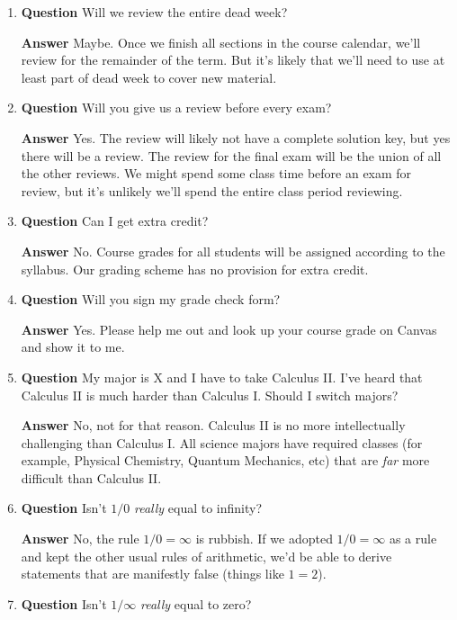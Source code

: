 \documentclass[12pt]{article}
\newcounter{ex}\setcounter{ex}{0}
\begin{document}
\begin{enumerate}
\item  \textbf{Question}  Will  we review the entire dead week?

\textbf{Answer} Maybe.  Once we finish all sections in the course 
calendar, we'll review for the remainder of the term.  But it's 
likely that we'll need to use at least part of dead week to cover
new material. 


\item  \textbf{Question}  Will you give us a review before every exam?

\textbf{Answer} Yes. The review will likely not have a complete solution key, but yes there will be a review. The review for the final exam will be the union of all the other reviews.  We might spend some class time before an exam for review, but it's unlikely we'll spend the entire class period reviewing. 

\item  \textbf{Question}  Can I get extra credit?

\textbf{Answer} No. Course grades for all students will be
assigned according to the syllabus. Our grading scheme has 
no provision for extra credit. 

\item  \textbf{Question}  Will you sign my grade check form?

\textbf{Answer} Yes.  Please help me out and look up your course grade on Canvas and show it to me.

\item  \textbf{Question}  My major is X and I have to take Calculus II.  I've heard that Calculus II is much harder than Calculus I.  Should I switch majors?

 \textbf{Answer}  No, not for that reason. Calculus II is no more intellectually challenging than Calculus I. All science majors have required classes (for example, Physical Chemistry, Quantum Mechanics, etc) that
are \emph{far} more difficult than Calculus II. 

\item  \textbf{Question} Isn't \(1/0\) \emph{really} equal to infinity?

  \textbf{Answer}  No,  the rule  \(1/0 = \infty\)  is rubbish. If we adopted    \(1/0 = \infty\) as a rule and kept the other usual rules of arithmetic, we'd be able to derive statements that
are manifestly false (things like \(1 = 2\)).


\item  \textbf{Question} Isn't \(1/\infty \) \emph{really} equal to zero?


\end{enumerate}
\end{document}

